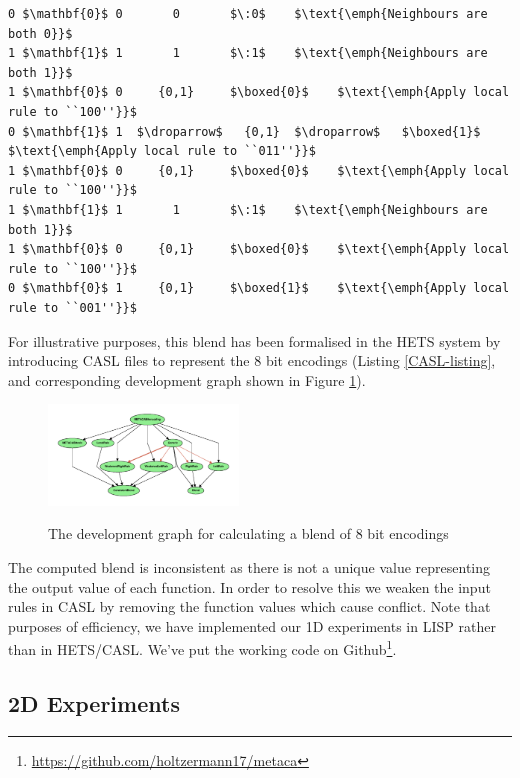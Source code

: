 \documentclass{AISB2008}
\makeatletter
\renewcommand{\boxed}[1]{\text{\fboxsep=.2em\fbox{\m@th$\displaystyle#1$}}}
\newcommand{\droparrow}{%
  \mathchoice{\raisebox{-4pt}{$\displaystyle\mapsto$}}
             {\raisebox{-4pt}{$\mapsto$}}
             {\raisebox{-2pt}{$\scriptstyle\mapsto$}}
             {\raisebox{-2pt}{$\scriptscriptstyle\mapsto$}}}
\makeatother
\begin{document}
\lstset{
  xleftmargin=.05\columnwidth, xrightmargin=.01\columnwidth
}

\begin{lstlisting}[mathescape]
0 $\mathbf{0}$ 0       0       $\:0$    $\text{\emph{Neighbours are both 0}}$
1 $\mathbf{1}$ 1       1       $\:1$    $\text{\emph{Neighbours are both 1}}$
1 $\mathbf{0}$ 0     {0,1}     $\boxed{0}$    $\text{\emph{Apply local rule to ``100''}}$
0 $\mathbf{1}$ 1  $\droparrow$   {0,1}  $\droparrow$   $\boxed{1}$    $\text{\emph{Apply local rule to ``011''}}$
1 $\mathbf{0}$ 0     {0,1}     $\boxed{0}$    $\text{\emph{Apply local rule to ``100''}}$
1 $\mathbf{1}$ 1       1       $\:1$    $\text{\emph{Neighbours are both 1}}$
1 $\mathbf{0}$ 0     {0,1}     $\boxed{0}$    $\text{\emph{Apply local rule to ``100''}}$
0 $\mathbf{0}$ 1     {0,1}     $\boxed{1}$    $\text{\emph{Apply local rule to ``001''}}$
\end{lstlisting}

For illustrative purposes, this blend has been formalised in the HETS
system \cite{mossakowski2007heterogeneous} by introducing CASL files
to represent the 8 bit encodings (Listing \ref{CASL-listing}, and corresponding development graph shown in Figure \ref{fig:hetsblend}). 
%
\begin{figure}[!ht]
\includegraphics[width=0.45\textwidth]{dol_dev.pdf}
\label{fig:hetsblend}
\caption{The development graph for calculating a blend of 8 bit encodings}
\end{figure}
%
The computed blend is inconsistent as there is not a unique value
representing the output value of each function.  In order to resolve
this we weaken the input rules in CASL by removing the function values
which cause conflict. 
%
Note that purposes of efficiency, we have implemented our 1D
experiments in LISP rather than in \mbox{HETS}/\mbox{CASL}.  We've put
the working code on
Github\footnote{\url{https://github.com/holtzermann17/metaca}}.


\subsection{2D Experiments} \label{2d-experiments-design}
\end{document}
